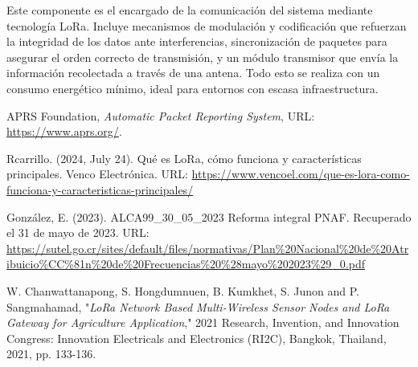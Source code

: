 \documentclass[conference]{IEEEtran}
\begin{document}
\vspace{2mm}

Este componente es el encargado de la comunicación del sistema mediante tecnología LoRa. Incluye mecanismos de modulación y codificación que refuerzan la integridad de los datos ante interferencias, sincronización de paquetes para asegurar el orden correcto de transmisión, y un módulo transmisor que envía la información recolectada a través de una antena. Todo esto se realiza con un consumo energético mínimo, ideal para entornos con escasa infraestructura.


\newpage


\begin{thebibliography}{20}
 

     APRS Foundation, \textit{Automatic Packet Reporting System}, URL: \url{https://www.aprs.org/}.
    
     Rcarrillo. (2024, July 24). Qué es LoRa, cómo funciona y características principales. Venco Electrónica. URL: \url {https://www.vencoel.com/que-es-lora-como-funciona-y-caracteristicas-principales/}

     González, E. (2023). ALCA99\_30\_05\_2023 Reforma integral PNAF. Recuperado el 31 de mayo de 2023. URL: \url {https://sutel.go.cr/sites/default/files/normativas/Plan%20Nacional%20de%20Atribuicio%CC%81n%20de%20Frecuencias%20%28mayo%202023%29_0.pdf}


     W. Chanwattanapong, S. Hongdumnuen, B. Kumkhet, S. Junon and P. Sangmahamad, "\textit{LoRa Network Based Multi-Wireless Sensor Nodes and LoRa Gateway for Agriculture Application}," 2021 Research, Invention, and Innovation Congress: Innovation Electricals and Electronics (RI2C), Bangkok, Thailand, 2021, pp. 133-136. 
    
 
\end{thebibliography}
\end{document}
